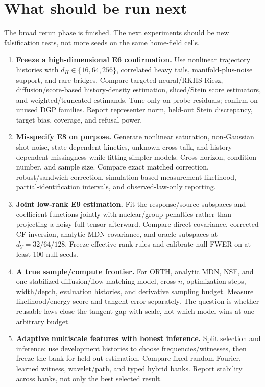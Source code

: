 \documentclass[10.5pt]{article}
\begin{document}
\section{What should be run next}

The broad rerun phase is finished.  The next experiments should be new falsification tests, not more seeds on the same home-field cells.

\begin{enumerate}
\item \textbf{Freeze a high-dimensional E6 confirmation.}  Use nonlinear trajectory histories with $d_H\in\{16,64,256\}$, correlated heavy tails, manifold-plus-noise support, and rare bridges.  Compare targeted neural/RKHS Riesz, diffusion/score-based history-density estimation, sliced/Stein score estimators, and weighted/truncated estimands.  Tune only on probe residuals; confirm on unused DGP families.  Report representer norm, held-out Stein discrepancy, target bias, coverage, and refusal power.
\item \textbf{Misspecify E8 on purpose.}  Generate nonlinear saturation, non-Gaussian shot noise, state-dependent kinetics, unknown cross-talk, and history-dependent missingness while fitting simpler models.  Cross horizon, condition number, and sample size.  Compare exact matched correction, robust/sandwich correction, simulation-based measurement likelihood, partial-identification intervals, and observed-law-only reporting.
\item \textbf{Joint low-rank E9 estimation.}  Fit the response/source subspaces and coefficient functions jointly with nuclear/group penalties rather than projecting a noisy full tensor afterward.  Compare direct covariance, corrected CF inversion, analytic MDN covariance, and oracle subspaces at $d_Y=32/64/128$.  Freeze effective-rank rules and calibrate null FWER on at least 100 null seeds.
\item \textbf{A true sample/compute frontier.}  For ORTH, analytic MDN, NSF, and one stabilized diffusion/flow-matching model, cross $n$, optimization steps, width/depth, evaluation histories, and derivative sampling budget.  Measure likelihood/energy score and tangent error separately.  The question is whether reusable laws close the tangent gap with scale, not which model wins at one arbitrary budget.
\item \textbf{Adaptive multiscale features with honest inference.}  Split selection and inference: use development histories to choose frequencies/witnesses, then freeze the bank for held-out estimation.  Compare fixed random Fourier, learned witness, wavelet/path, and typed hybrid banks.  Report stability across banks, not only the best selected result.
\end{enumerate}
\end{document}
